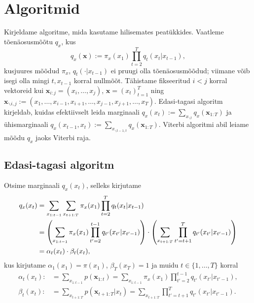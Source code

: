 
\section{Algoritmid}

Kirjeldame algoritme, mida kasutame hilisemates peatükkides. Vaatleme tõenäosusmõõtu $q_x$, kus 
\begin{equation}
    \label{eq:almost_markovian}
    q_x(\bm{x}) := \pi_x(x_1) \prod_{t=2}^T q_{t}(x_{t} | x_{t-1}),
\end{equation}
kusjuures mõõdud $\pi_x$, $q_t(\cdot|x_{t-1})$ ei pruugi olla tõenäosusmõõdud; viimane võib isegi olla mingi $t, x_{t-1}$ korral nullmõõt.
Tähistame fikseeritud $i < j$ korral vektoreid kui $\bm{x}_{i:j} = (x_i,\ldots,x_j)$, $\bm{x} = (x_t)_{t=1}^T$ ning $\bm{x}_{\backslash i, j} := (x_1,\ldots,x_{i-1},x_{i+1},\ldots,x_{j-1},x_{j+1},\ldots,x_T)$. 
Edasi-tagasi algoritm kirjeldab, kuidas efektiivselt leida marginaali $q_x(x_t):= \sum_{x_{\backslash t}}q_x(\bm{x}_{1:T})$ ja ühismarginaali $q_x(x_{t-1},x_t) := \sum_{x_{\backslash t-1,t}}q_x(\bm{x}_{1:T})$. Viterbi algoritmi abil leiame mõõdu $q_x$ jaoks Viterbi raja. 

\subsection{Edasi-tagasi algoritm}
\label{chapter:forw_back}


Otsime marginaali $q_x(x_t)$, selleks kirjutame
\begin{align}
    \notag
    q_x(x_t) &= \sum_{x_{1:t-1}} \sum_{x_{t+1:T}} {\pi_x(x_1) \prod_{t=2}^T q_t(x_t|x_{t-1})} \\
    \notag
    &= \left( \sum_{x_{1:t-1}} {\pi_x(x_1) \prod_{t'=2}^{t-1} q_{t'}(x_{t'}|x_{t'-1})} \right) \cdot \left( \sum_{x_{t+1:T}} {\prod_{t'=t+1}^{T} q_{t'}(x_{t'}|x_{t'-1})} \right) \\
    \label{eq:fb1}
    &= \alpha_t(x_t)  \cdot \beta_t(x_t),
\end{align}
kus kirjutame $\alpha_1(x_1) = \pi(x_1)$, $\beta_T(x_T) = 1$ ja muidu $t \in \{ 1,\ldots,T\}$ korral
\begin{align*}
    \alpha_t(x_t) :&= \sum_{x_{1:t-1}} p(\bm{x}_{1:t})=  \sum_{x_{1:t-1}} {\pi_x(x_1) \prod_{t'=2}^{t-1} q_{t'}(x_{t'}|x_{t'-1})} ,\\
    \beta_t(x_t) :&= \sum_{x_{t+1:T}} p(\bm{x}_{t+1:T}|x_t) = \sum_{x_{t+1:T}} {\prod_{t'=t+1}^{T} q_{t'}(x_{t'}|x_{t'-1})}.
\end{align*}

